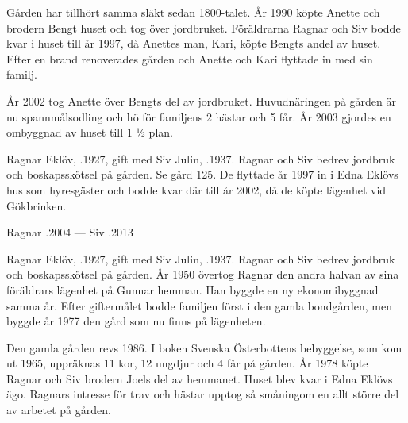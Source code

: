 Gården har tillhört samma släkt sedan 1800-talet. År 1990 köpte Anette och brodern Bengt huset och tog över jordbruket. Föräldrarna Ragnar och Siv bodde kvar i huset till år 1997, då Anettes man, Kari, köpte Bengts andel av huset. Efter en brand renoverades gården och Anette och Kari flyttade in med sin familj.

År 2002 tog Anette över Bengts del av jordbruket. Huvudnäringen på gården är nu spannmålsodling och hö för familjens 2 hästar och 5 får. År 2003 gjordes en ombyggnad av huset till 1 ½ plan.


Ragnar Eklöv, .1927, gift med Siv Julin, .1937. Ragnar och Siv bedrev jordbruk och boskapsskötsel på gården. Se gård 125. De flyttade år 1997 in i Edna Eklövs hus som hyresgäster och bodde kvar där till år 2002, då de köpte lägenhet vid Gökbrinken.

Ragnar .2004  ---  Siv .2013





Ragnar Eklöv, .1927, gift med Siv Julin, .1937. Ragnar och Siv bedrev jordbruk och boskapsskötsel på gården. År 1950 övertog Ragnar den andra halvan av sina föräldrars lägenhet på Gunnar hemman. Han byggde en ny ekonomibyggnad samma år. Efter giftermålet bodde familjen först i den gamla bondgården, men byggde år 1977 den gård som nu finns på lägenheten.
\begin{jhchildren}
  \item {}
  \item \jhperson{\jhbold{\jhname[Anette]{Eklöv, Anette}\}{19.01.1968}{}
  \item \jhperson{\jhname[Kristine]{Eklöv, Kristine}}{28.12.1973}{}, gift Paulin, familjedagvårdare i Vörå
\end{jhchildren}

Den gamla gården revs 1986. I boken Svenska Österbottens bebyggelse, som  kom ut 1965, uppräknas 11 kor, 12 ungdjur och 4 får på gården. År 1978 köpte Ragnar och Siv brodern Joels del av hemmanet. Huset blev kvar i Edna Eklövs ägo. Ragnars intresse för trav och hästar upptog så småningom en allt större del av arbetet på gården.


